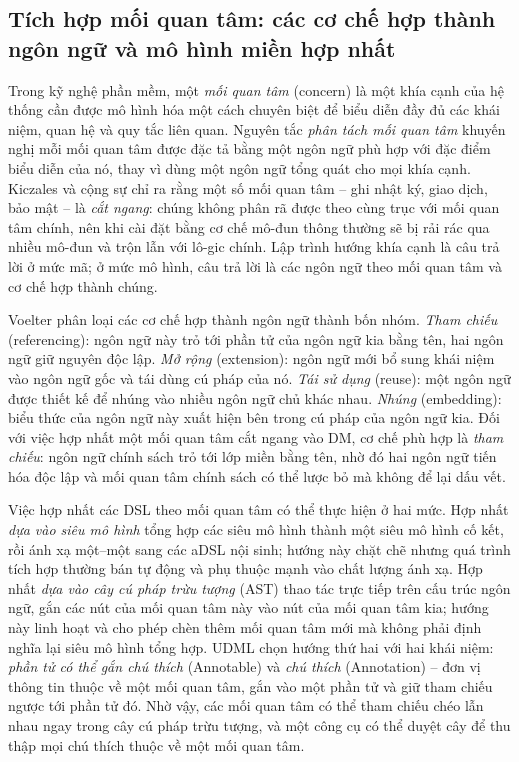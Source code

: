 \subsection{Tích hợp mối quan tâm: các cơ chế hợp thành ngôn ngữ và mô hình miền hợp nhất}
\label{sec:tich-hop}

Trong kỹ nghệ phần mềm, một \emph{mối quan tâm} (concern) là một khía cạnh của hệ thống cần được mô hình hóa một cách chuyên biệt để biểu diễn đầy đủ các khái niệm, quan hệ và quy tắc liên quan. Nguyên tắc \emph{phân tách mối quan tâm} khuyến nghị mỗi mối quan tâm được đặc tả bằng một ngôn ngữ phù hợp với đặc điểm biểu diễn của nó, thay vì dùng một ngôn ngữ tổng quát cho mọi khía cạnh. Kiczales và cộng sự \cite{kiczales1997} chỉ ra rằng một số mối quan tâm -- ghi nhật ký, giao dịch, bảo mật -- là \emph{cắt ngang}: chúng không phân rã được theo cùng trục với mối quan tâm chính, nên khi cài đặt bằng cơ chế mô-đun thông thường sẽ bị rải rác qua nhiều mô-đun và trộn lẫn với lô-gic chính. Lập trình hướng khía cạnh là câu trả lời ở mức mã; ở mức mô hình, câu trả lời là các ngôn ngữ theo mối quan tâm và cơ chế hợp thành chúng.

Voelter \cite{voelter2013} phân loại các cơ chế hợp thành ngôn ngữ thành bốn nhóm. \emph{Tham chiếu} (referencing): ngôn ngữ này trỏ tới phần tử của ngôn ngữ kia bằng tên, hai ngôn ngữ giữ nguyên độc lập. \emph{Mở rộng} (extension): ngôn ngữ mới bổ sung khái niệm vào ngôn ngữ gốc và tái dùng cú pháp của nó. \emph{Tái sử dụng} (reuse): một ngôn ngữ được thiết kế để nhúng vào nhiều ngôn ngữ chủ khác nhau. \emph{Nhúng} (embedding): biểu thức của ngôn ngữ này xuất hiện bên trong cú pháp của ngôn ngữ kia. Đối với việc hợp nhất một mối quan tâm cắt ngang vào DM, cơ chế phù hợp là \emph{tham chiếu}: ngôn ngữ chính sách trỏ tới lớp miền bằng tên, nhờ đó hai ngôn ngữ tiến hóa độc lập và mối quan tâm chính sách có thể lược bỏ mà không để lại dấu vết.

Việc hợp nhất các DSL theo mối quan tâm có thể thực hiện ở hai mức. Hợp nhất \emph{dựa vào siêu mô hình} tổng hợp các siêu mô hình thành một siêu mô hình cố kết, rồi ánh xạ một--một sang các aDSL nội sinh; hướng này chặt chẽ nhưng quá trình tích hợp thường bán tự động và phụ thuộc mạnh vào chất lượng ánh xạ. Hợp nhất \emph{dựa vào cây cú pháp trừu tượng} (AST) thao tác trực tiếp trên cấu trúc ngôn ngữ, gắn các nút của mối quan tâm này vào nút của mối quan tâm kia; hướng này linh hoạt và cho phép chèn thêm mối quan tâm mới mà không phải định nghĩa lại siêu mô hình tổng hợp. UDML \cite{le2025udml} chọn hướng thứ hai với hai khái niệm: \emph{phần tử có thể gắn chú thích} (Annotable) và \emph{chú thích} (Annotation) -- đơn vị thông tin thuộc về một mối quan tâm, gắn vào một phần tử và giữ tham chiếu ngược tới phần tử đó. Nhờ vậy, các mối quan tâm có thể tham chiếu chéo lẫn nhau ngay trong cây cú pháp trừu tượng, và một công cụ có thể duyệt cây để thu thập mọi chú thích thuộc về một mối quan tâm.

